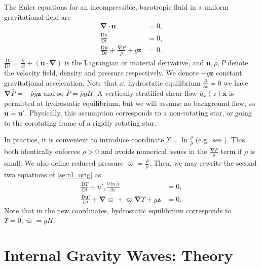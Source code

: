 \documentclass[
        fleqn,
        usenatbib,
    ]{mnras}
\newcommand*{\pd}[2]{\frac{\partial#1}{\partial#2}}
\newcommand*{\md}[2]{\frac{\mathrm{D}#1}{\mathrm{D}#2}}
\newcommand*{\p}[1]{\left(#1\right)}
\newcommand*{\bm}[1]{\boldsymbol{\mathbf{#1}}}
\begin{document}
The Euler equations for an incompressible, barotropic fluid in a uniform
gravitational field are
\begin{subequations}\label{se:nl_orig}
    \begin{align}
        \bm{\nabla} \cdot \bm{u} &= 0,\label{eq:nl_incomp}\\
        \md{\rho}{t} &= 0 ,\label{eq:nl_density}\\
        \md{\bm{u}}{t} + \frac{\bm{\nabla}P}{\rho} + g\bm{z} &=
            0\label{eq:nl_mom}.
    \end{align}
\end{subequations}
$\md{}{t} = \pd{}{t} + \p{\bm{u} \cdot \bm{\nabla}}$ is the Lagrangian or
material derivative, and $\bm{u}, \rho, P$ denote the velocity field, density
and pressure respectively. We denote $-g\bm{z}$ constant gravitational
acceleration. Note that at hydrostatic equilibrium $\pd{}{t} = 0$ we have
$\bm{\nabla}\overline{P} = -\overline{\rho} g\bm{z}$ and so $\overline{P} =
\overline{\rho} gH$. A vertically-stratified shear flow
$\overline{u}_x(z)\bm{x}$ is permitted at hydrostatic equilibrium, but we will
assume no background flow, so $\bm{u} = \bm{u}'$. Physically, this assumption
corresponds to a non-rotating star, or going to the corotating frame of a
rigidly rotating star.

In practice, it is convenient to introduce coordinate $\Upsilon = \ln
\frac{\rho}{\overline{\rho}}$ (e.g.\ see \citep{lecoanet_anel}). This both
identically enforces $\rho > 0$ and avoids numerical issues in the
$\frac{\bm{\nabla}P}{\rho}$ term if $\rho$ is small. We also define reduced
pressure $\varpi = \frac{P}{\rho}$. Then, we may rewrite the second two
equations of \autoref{se:nl_orig} as
\begin{subequations}\label{se:nl_upsilon}
    \begin{align}
        \md{\Upsilon}{t} + u'_z \pd{\ln \overline{\rho}}{z} &= 0
            ,\label{eq:nl_up_density} \\
        \md{\bm{u}'}{t} + \bm{\nabla}\varpi
            + \varpi\bm{\nabla}\Upsilon + g\bm{z} &= 0.
    \end{align}
\end{subequations}
Note that in the new coordinates, hydrostatic equilibrium corresponds to
$\Upsilon = 0, \overline{\varpi} = gH$.

\section{Internal Gravity Waves: Theory}\label{s:theory}
\end{document}

